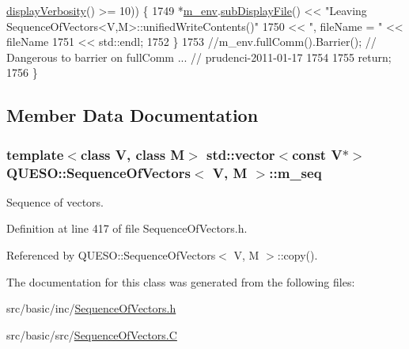 \begin{DoxyCode}
      \hyperlink{class_q_u_e_s_o_1_1_base_environment_a1fe5f244fc0316a0ab3e37463f108b96}{displayVerbosity}() >= 10)) \{
1749     *\hyperlink{class_q_u_e_s_o_1_1_base_vector_sequence_a8e8824d2a63c5a43bcc6473e3a0491e8}{m\_env}.\hyperlink{class_q_u_e_s_o_1_1_base_environment_a8a0064746ae8dddfece4229b9ad374d6}{subDisplayFile}() << \textcolor{stringliteral}{"Leaving SequenceOfVectors<V,M>::unifiedWriteContents()"}
1750                             << \textcolor{stringliteral}{", fileName = "} << fileName
1751                             << std::endl;
1752   \}
1753   \textcolor{comment}{//m\_env.fullComm().Barrier(); // Dangerous to barrier on fullComm ... // prudenci-2011-01-17}
1754 
1755   \textcolor{keywordflow}{return};
1756 \}
\end{DoxyCode}


\subsection{Member Data Documentation}
\hypertarget{class_q_u_e_s_o_1_1_sequence_of_vectors_ae83e7c53439265667809256d0d302e5b}{
\subsubsection[{m\-\_\-seq}]{\setlength{\rightskip}{0pt plus 5cm}template$<$class V, class M$>$ std\-::vector$<$const V$\ast$$>$ {\bf Q\-U\-E\-S\-O\-::\-Sequence\-Of\-Vectors}$<$ V, M $>$\-::m\-\_\-seq\hspace{0.3cm}{\ttfamily [private]}}}\label{class_q_u_e_s_o_1_1_sequence_of_vectors_ae83e7c53439265667809256d0d302e5b}


Sequence of vectors. 



Definition at line 417 of file Sequence\-Of\-Vectors.\-h.



Referenced by Q\-U\-E\-S\-O\-::\-Sequence\-Of\-Vectors$<$ V, M $>$\-::copy().



The documentation for this class was generated from the following files\-:\begin{DoxyCompactItemize}
\item 
src/basic/inc/\hyperlink{_sequence_of_vectors_8h}{Sequence\-Of\-Vectors.\-h}\item 
src/basic/src/\hyperlink{_sequence_of_vectors_8_c}{Sequence\-Of\-Vectors.\-C}\end{DoxyCompactItemize}
